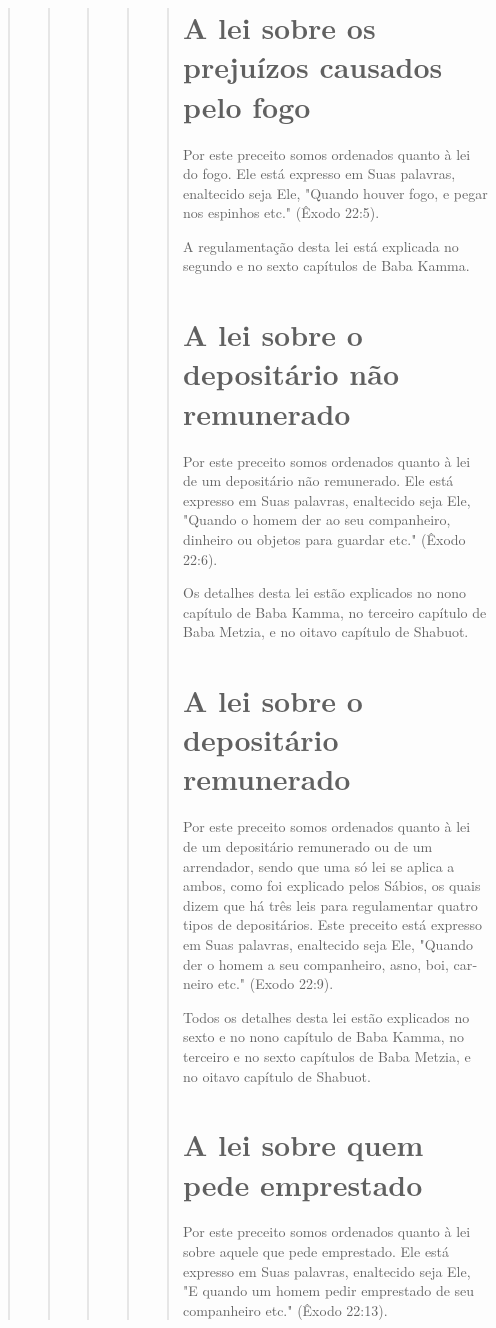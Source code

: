 \begin{quote}
\begin{quote}
\begin{quote}
\begin{quote}
\begin{quote}


\section{A lei sobre os prejuízos causados pelo fogo}

Por este preceito somos ordenados quanto à lei do fogo. Ele está
ex­presso em Suas palavras, enaltecido seja Ele, "Quando houver fogo, e
pegar nos espinhos etc." (Êxodo 22:5).

A regulamentação desta lei está explicada no segundo e no sexto
ca­pítulos de Baba Kamma.

\section{A lei sobre o depositário não remunerado}

Por este preceito somos ordenados quanto à lei de um depositário não
remunerado. Ele está expresso em Suas palavras, enaltecido seja Ele,
"Quando o homem der ao seu companheiro, dinheiro ou objetos para
guar­dar etc." (Êxodo 22:6).

Os detalhes desta lei estão explicados no nono capítulo de Baba Kam­ma,
no terceiro capítulo de Baba Metzia, e no oitavo capítulo de Shabuot.

\section{A lei sobre o depositário remunerado}

Por este preceito somos ordenados quanto à lei de um depositário
remunerado ou de um arrendador, sendo que uma só lei se aplica a ambos,
co­mo foi explicado pelos Sábios, os quais dizem que há três leis para
regulamen­tar quatro tipos de depositários. Este preceito está expresso
em Suas palavras, enaltecido seja Ele, "Quando der o homem a seu
companheiro, asno, boi, car­neiro etc." (Exodo 22:9).

Todos os detalhes desta lei estão explicados no sexto e no nono
ca­pítulo de Baba Kamma, no terceiro e no sexto capítulos de Baba
Metzia, e no oitavo capítulo de Shabuot.

\section{A lei sobre quem pede emprestado}

Por este preceito somos ordenados quanto à lei sobre aquele que pede
emprestado. Ele está expresso em Suas palavras, enaltecido seja Ele, "E
quando um homem pedir emprestado de seu companheiro etc." (Êxodo 22:13).


\end{quote}
\end{quote}
\end{quote}
\end{quote}
\end{quote}
